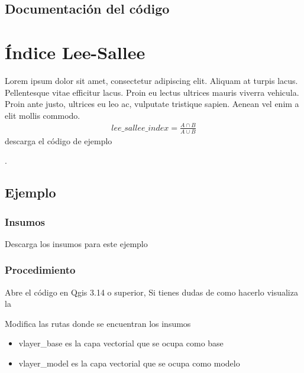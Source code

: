 \documentclass[letterpaper,10pt,spanish]{sphinxmanual}
\begin{document}
\section{Documentación del código}
\label{\detokenize{analisis:documentacion-del-codigo}}

\chapter{Índice Lee-Sallee}
\label{\detokenize{leesallee:indice-lee-sallee}}\label{\detokenize{leesallee::doc}}
Lorem ipsum dolor sit amet, consectetur adipiscing elit.
Aliquam at turpis lacus. Pellentesque vitae efficitur lacus.
Proin eu lectus ultrices mauris viverra vehicula. Proin ante justo,
ultrices eu leo ac, vulputate tristique sapien. Aenean vel enim a elit mollis commodo.
\begin{equation*}
\begin{split}lee\_sallee\_index =  \frac{A\cap B}{A\cup B}\end{split}
\end{equation*}
descarga el código de ejemplo

.


\section{Ejemplo}
\label{\detokenize{leesallee:ejemplo}}

\subsection{Insumos}
\label{\detokenize{leesallee:insumos}}
Descarga los insumos para este ejemplo 


\subsection{Procedimiento}
\label{\detokenize{leesallee:procedimiento}}
Abre el código  en Qgis 3.14 o superior,
Si tienes dudas de como hacerlo visualiza la 

Modifica las rutas donde se encuentran los insumos
\begin{itemize}
\item {} 
vlayer\_base es la capa vectorial que se ocupa como base

\item {} 
vlayer\_model es la capa vectorial que se ocupa como modelo

\end{itemize}
\end{document}
